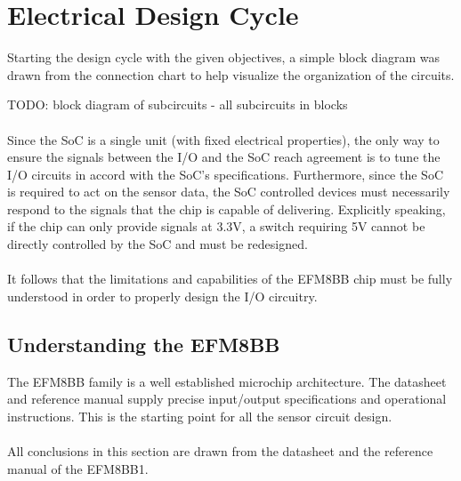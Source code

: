 \documentclass[12pt]{article}
\begin{document}
	\section{Electrical Design Cycle\label{sec:devel-electr-design}} 

  Starting the design cycle with the given objectives, a simple block diagram was drawn from the connection chart to help visualize the organization of the circuits.

  TODO: block diagram of subcircuits - all subcircuits in blocks

  \paragraph{}
  Since the SoC is a single unit (with fixed electrical properties), the only way to ensure the signals between the I/O and the SoC reach agreement is to tune the I/O circuits in accord with the SoC's specifications. Furthermore, since the SoC is required to act on the sensor data, the SoC controlled devices must necessarily respond to the signals that the chip is capable of delivering. Explicitly speaking, if the chip can only provide signals at 3.3V, a switch requiring 5V cannot be directly controlled by the SoC and must be redesigned.
  
  \paragraph{}
  It follows that the limitations and capabilities of the EFM8BB chip must be fully understood in order to properly design the I/O circuitry.
  
  \subsection{Understanding the EFM8BB\label{sec:understanding-soc}}

  The EFM8BB family is a well established microchip architecture. The datasheet\cite{silabs:efm8bb1ds}  and reference manual\cite{silabs:efm8bb1rm} supply precise input/output specifications and operational instructions. This is the starting point for all the sensor circuit design.


  \paragraph{}
  All conclusions in this section are drawn from the datasheet and the reference manual of the EFM8BB1. 
\end{document}
